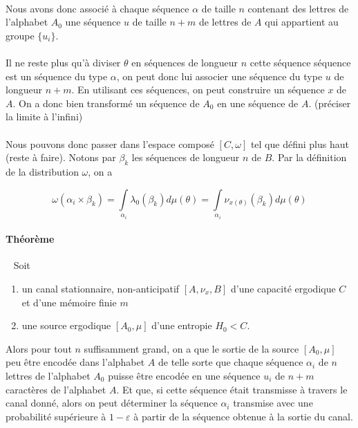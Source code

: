 	\paragraph{}
	Nous avons donc associé à chaque séquence $\alpha$ de taille $n$ contenant des lettres de l'alphabet $A_0$ une séquence $u$ de taille $n+m$ de
	lettres de $A$ qui appartient au groupe $\{u_i\}$. 
	
	\paragraph{}
	Il ne reste plus qu'à diviser $\theta$ en séquences de longueur $n$ cette séquence séquence est un séquence du type $\alpha$, on peut donc lui 
	associer une séquence du type $u$ de longueur $n+m$. En utilisant ces séquences, on peut construire un séquence $x$ de $A$. On a donc bien transformé
	un séquence de $A_0$ en une séquence de $A$. (préciser la limite à l'infini)
	
	\paragraph{}
	Nous pouvons donc passer dans l'espace composé $[C,\omega]$ tel que défini plus haut (reste à faire). Notons par $\beta_k$ les séquences de longueur $n$ de $B$.
	Par la définition de la distribution $\omega$, on a 
	
	\[\omega(\alpha_i\times\beta_k)=\int\limits_{\alpha_i}\lambda_0(\beta_k)d\mu(\theta)=\int\limits_{\alpha_i}\nu_{x(\theta)}(\beta_k)d\mu(\theta)\]
	
	\paragraph{Théorème}\ 
	\newline
	Soit 
	\begin{enumerate}
		\item un canal stationnaire, non-anticipatif $[A,\nu_x,B]$ d'une capacité ergodique $C$ et d'une mémoire finie $m$
		\item une source ergodique $[A_0,\mu]$ d'une entropie $H_0<C$.
	\end{enumerate}
	Alors pour tout $n$ suffisamment grand, on a que le sortie de la source $[A_0,\mu]$ peu être encodée dans l'alphabet $A$ de telle sorte que
	chaque séquence $\alpha_i$ de $n$ lettres de l'alphabet $A_0$ puisse être encodée en une séquence $u_i$ de $n+m$ caractères de l'alphabet $A$. 
	Et que, si cette séquence était transmisse à travers le canal donné, alors on peut déterminer la séquence $\alpha_i$ transmise avec une probabilité 
	supérieure à $1-\varepsilon$ à partir de la séquence obtenue à la sortie du canal.


